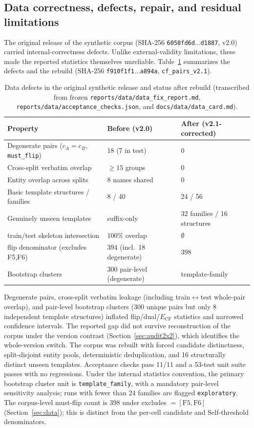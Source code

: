 \documentclass[11pt,twocolumn]{article}
\begin{document}
\subsection{Data correctness, defects, repair, and residual limitations}
\label{sec:datafix}

The original release of the synthetic corpus (SHA-256
\texttt{6058fd6d$\ldots$d1887}, v2.0) carried internal-correctness defects.
Unlike external-validity limitations, these made the reported statistics
themselves unreliable. Table~\ref{tab:datafix} summarizes the defects and the
rebuild (SHA-256 \texttt{f910f1f1$\ldots$a894a}, \texttt{cf\_pairs\_v2.1}).

\begin{table}[t]
\centering
\caption{Data defects in the original synthetic release and status after
rebuild (transcribed from frozen \texttt{reports/data/data\_fix\_report.md},
\texttt{reports/data/acceptance\_checks.json}, and \texttt{docs/data/data\_card.md}).}
\label{tab:datafix}
\begin{tabular}{lll}
\toprule
Property & Before (v2.0) & After (v2.1-corrected) \\
\midrule
Degenerate pairs ($c_A{=}c_B$, \texttt{must\_flip}) & 18 (7 in test) & 0 \\
Cross-split verbatim overlap & $\geq15$ groups & 0 \\
Entity overlap across splits & 8 names shared & 0 \\
Basic template structures / families & 8 / 40 & 24 / 56 \\
Genuinely unseen templates & suffix-only & 32 families / 16 structures \\
train/test skeleton intersection & 100\% overlap & $\emptyset$ \\
flip denominator (excludes F5,F6) & 394 (incl.\ 18 degenerate) & 398 \\
Bootstrap clusters & 300 pair-level (degenerate) & template-family \\
\bottomrule
\end{tabular}
\end{table}

Degenerate pairs, cross-split verbatim leakage (including
train$\leftrightarrow$test whole-pair overlap), and pair-level bootstrap
clusters (300 unique pairs but only 8 independent template structures) inflated
flip/dual/$E_{\mathrm{CF}}$ statistics and narrowed confidence intervals. The
reported gap did not survive reconstruction of the corpus under the version
contrast (Section~\ref{sec:audit2x2}), which identifies the whole-version
switch. The corpus was rebuilt with forced candidate distinctness,
split-disjoint entity pools, deterministic deduplication, and 16 structurally
distinct unseen templates. Acceptance checks pass 11/11 and a 53-test unit
suite passes with no regressions. Under the internal statistics convention,
the primary bootstrap cluster unit is \texttt{template\_family},
with a mandatory pair-level sensitivity analysis; runs with fewer than 24
families are flagged \texttt{exploratory}. The corpus-level must-flip count is
$398$ under excludes $=[\mathrm{F5},\mathrm{F6}]$ (Section~\ref{sec:data});
this is distinct from the per-cell candidate and Self-threshold denominators.
\end{document}
